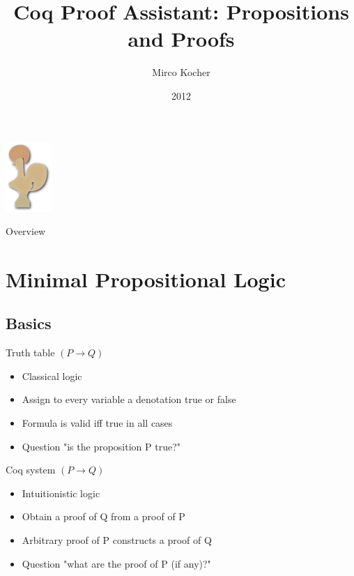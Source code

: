 
\title{Coq Proof Assistant: Propositions and Proofs}
\author{Mirco Kocher}
\date{2012}


{ \logo{} %
\begin{frame} %
	\begin{center}
		\includegraphics{coq_logo.png}
	\end{center}	
	\titlepage	
\end{frame}
}

\begin{frame}{Overview}
\end{frame}

\section{Minimal Propositional Logic}

\subsection{Basics}
\begin{frame}{Truth table}
	$(P \rightarrow Q)$
	\begin{itemize}
		\item Classical logic
		\pause
		\item Assign to every variable a denotation true or false
		\pause		
		\item Formula is valid iff true in all cases
		\pause
		\item Question "is the proposition P true?"
	\end{itemize}
\end{frame}
\begin{frame}{Coq system}
	$(P \rightarrow Q)$
	\begin{itemize}
		\item Intuitionistic logic
		\pause
		\item Obtain a proof of Q from a proof of P
		\pause		
		\item Arbitrary proof of P constructs a proof of Q
		\pause
		\item Question "what are the proof of P (if any)?"
	\end{itemize}
\end{frame}

